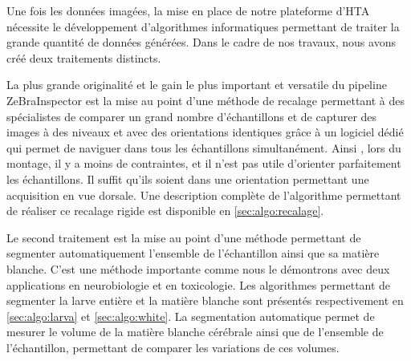 \documentclass[\main/main.tex]{subfiles}
\begin{document}
%
Une fois les données imagées, la mise en place de notre plateforme d'HTA
nécessite le développement d'algorithmes informatiques permettant de traiter
la grande quantité de données générées.
%
Dans le cadre de nos travaux, nous avons créé deux traitements distincts.

\label{sec:lempereur_bio:recalage}
%
La plus grande originalité et le gain le plus important et versatile du pipeline ZeBraInspector est la mise au point d'une méthode de recalage
permettant à des spécialistes de comparer un grand nombre d'échantillons et de capturer des images à des niveaux et avec des orientations identiques grâce à un logiciel dédié qui permet de naviguer dans tous les échantillons simultanément.
%
Ainsi , lors du montage, il y a moins de contraintes, et il n'est pas utile d'orienter parfaitement les échantillons. Il suffit qu'ils soient dans une orientation permettant une acquisition en vue dorsale.  
%
Une description complète de l'algorithme permettant de réaliser ce recalage rigide est disponible en \autoref{sec:algo:recalage}.

Le second traitement est la mise au point d'une méthode permettant de segmenter automatiquement
l'ensemble de l'échantillon ainsi que sa matière blanche. C'est une méthode importante comme nous le démontrons avec deux applications en neurobiologie  et en toxicologie. 
% 
Les algorithmes permettant de segmenter la larve entière et la matière blanche sont présentés respectivement en \autoref{sec:algo:larva} et \autoref{sec:algo:white}.
%
La segmentation automatique permet de mesurer le volume de la matière blanche cérébrale
ainsi que de l'ensemble de l'échantillon, permettant de comparer les variations de ces
volumes.

\end{document}
